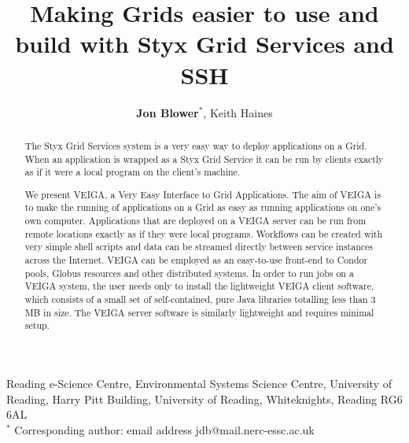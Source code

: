 \documentclass[a4paper]{article}
\begin{document}
\title{Making Grids easier to use and build with Styx Grid Services and SSH}

\author{\textbf{Jon Blower$^{*}$}, Keith Haines}
\date{}

\maketitle

\begin{center}
Reading e-Science Centre, Environmental Systems Science Centre, University of Reading, Harry Pitt Building, University of Reading, Whiteknights, Reading RG6 6AL \\
\medskip
$^{*}$ Corresponding author: email address jdb@mail.nerc-essc.ac.uk
\end{center}

\bigskip

\begin{abstract}
The Styx Grid Services system is a very easy way to deploy applications on a Grid.  When an application is wrapped as a Styx Grid Service it can be run by clients exactly as if it were a local program on the client's machine.  

We present VEIGA, a Very Easy Interface to Grid Applications.  The aim of VEIGA is to make the running of applications on a Grid as easy as running applications on one's own computer.  Applications that are deployed on a VEIGA server can be run from remote locations exactly as if they were local programs.  Workflows can be created with very simple shell scripts and data can be streamed directly between service instances across the Internet.  VEIGA can be employed as an easy-to-use front-end to Condor pools, Globus resources and other distributed systems.  In order to run jobs on a VEIGA system, the user needs only to install the lightweight VEIGA client software, which consists of a small set of self-contained, pure Java libraries totalling less than 3 MB in size.  The VEIGA server software is similarly lightweight and requires minimal setup.
\end{abstract}

\bigskip
\end{document}
